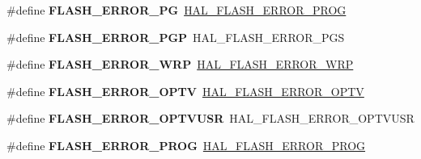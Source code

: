 \begin{DoxyCompactItemize}
\item 
\mbox{\label{group___h_a_l___f_l_a_s_h___aliased___defines_gaf48b018af2eb334ed886221152b674c6}} 
\#define {\bfseries F\+L\+A\+S\+H\+\_\+\+E\+R\+R\+O\+R\+\_\+\+PG}~\hyperlink{group___f_l_a_s_h___error___codes_ga516a75e6f98eed9daefa0b442a74c04b}{H\+A\+L\+\_\+\+F\+L\+A\+S\+H\+\_\+\+E\+R\+R\+O\+R\+\_\+\+P\+R\+OG}
\item 
\mbox{\label{group___h_a_l___f_l_a_s_h___aliased___defines_ga83c5d3706b564f740672468d1618186d}} 
\#define {\bfseries F\+L\+A\+S\+H\+\_\+\+E\+R\+R\+O\+R\+\_\+\+P\+GP}~H\+A\+L\+\_\+\+F\+L\+A\+S\+H\+\_\+\+E\+R\+R\+O\+R\+\_\+\+P\+GS
\item 
\mbox{\label{group___h_a_l___f_l_a_s_h___aliased___defines_ga25f249bad0630be8d59b2e4fd5e83e63}} 
\#define {\bfseries F\+L\+A\+S\+H\+\_\+\+E\+R\+R\+O\+R\+\_\+\+W\+RP}~\hyperlink{group___f_l_a_s_h___error___codes_ga27e871d85f9311272098315bc3723075}{H\+A\+L\+\_\+\+F\+L\+A\+S\+H\+\_\+\+E\+R\+R\+O\+R\+\_\+\+W\+RP}
\item 
\mbox{\label{group___h_a_l___f_l_a_s_h___aliased___defines_ga88b48ae21a2c56004f16cf62246aa411}} 
\#define {\bfseries F\+L\+A\+S\+H\+\_\+\+E\+R\+R\+O\+R\+\_\+\+O\+P\+TV}~\hyperlink{group___f_l_a_s_h___error___codes_ga9fe984a57c2e92c27c4217468d1b2d93}{H\+A\+L\+\_\+\+F\+L\+A\+S\+H\+\_\+\+E\+R\+R\+O\+R\+\_\+\+O\+P\+TV}
\item 
\mbox{\label{group___h_a_l___f_l_a_s_h___aliased___defines_ga6bcc50c3baf4770eab5bb4bb6c8ca505}} 
\#define {\bfseries F\+L\+A\+S\+H\+\_\+\+E\+R\+R\+O\+R\+\_\+\+O\+P\+T\+V\+U\+SR}~H\+A\+L\+\_\+\+F\+L\+A\+S\+H\+\_\+\+E\+R\+R\+O\+R\+\_\+\+O\+P\+T\+V\+U\+SR
\item 
\mbox{\label{group___h_a_l___f_l_a_s_h___aliased___defines_ga737128e267cde11757448a999b907a7c}} 
\#define {\bfseries F\+L\+A\+S\+H\+\_\+\+E\+R\+R\+O\+R\+\_\+\+P\+R\+OG}~\hyperlink{group___f_l_a_s_h___error___codes_ga516a75e6f98eed9daefa0b442a74c04b}{H\+A\+L\+\_\+\+F\+L\+A\+S\+H\+\_\+\+E\+R\+R\+O\+R\+\_\+\+P\+R\+OG}
\item 

\end{DoxyCompactItemize}
